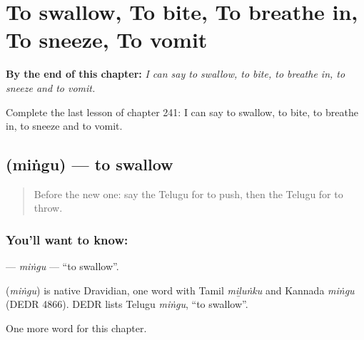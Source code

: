 
\chapter{To swallow, To bite, To breathe in, To sneeze, To vomit}
\label{ch:te-to-swallow-to-bite-to-breathe-in-to-sneeze-to-vomit}

\begin{chapteropening}
\textbf{By the end of this chapter:} \emph{I can say to swallow, to bite, to breathe in, to sneeze and to vomit.}

Complete the last lesson of chapter 241: I can say to swallow, to bite, to breathe in, to sneeze and to vomit.
\end{chapteropening}

\section[\texorpdfstring{\te{మింగు} (miṅgu)}{మింగు (miṅgu)}]{ (miṅgu) — to swallow}

\label{lesson:TE-C241-mingu}



\begin{quote}
Before the new one: say the Telugu for to push, then the Telugu for to throw.
\end{quote}

\subsection*{You'll want to know: }
\textbf{} — \emph{miṅgu} — \textquotedblleft{}to swallow\textquotedblright{}.

\begin{cousinweb}
\textbf{} (\emph{miṅgu}) is native Dravidian, one word with Tamil \emph{miḻuṅku} and Kannada \emph{miṅgu} (DEDR 4866). DEDR lists Telugu \emph{miṅgu}, \textquotedblleft{}to swallow\textquotedblright{}.
\end{cousinweb}

\begin{grammarlens}[title={What you've built}]
One more word for this chapter.
\end{grammarlens}

